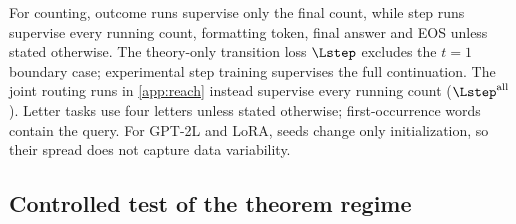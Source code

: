 \begin{table}[H]
\centering\small
{}
\caption{\textbf{Shared experimental settings.} Task-specific exceptions are stated in the corresponding subsections.}
\label{tab:protocol}
\end{table}

For counting, outcome runs supervise only the final count, while step runs supervise every running count, formatting token,
final answer and EOS unless stated otherwise. The theory-only transition loss $\Lstep$ excludes the $t=1$ boundary case;
experimental step training supervises the full continuation. The joint routing runs in \cref{app:reach} instead supervise
every running count ($\Lstep^{\mathrm{all}}$). Letter tasks use four letters unless stated otherwise; first-occurrence words contain the query.
For GPT-2L and LoRA, seeds change only initialization, so their spread does not capture data variability.

\subsection{Controlled test of the theorem regime}
\label{app:exp-regime}
\label{app:regime}
